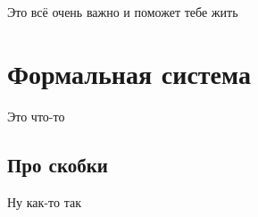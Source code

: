 \documentclass[a4paper,article,14pt]{extarticle}
\begin{document}


\tableofcontents
\pagebreak
{}
Это всё очень важно и поможет тебе жить

\section{Формальная система}
Это что-то

\subsection{Про скобки}
Ну как-то так
\end{document}
